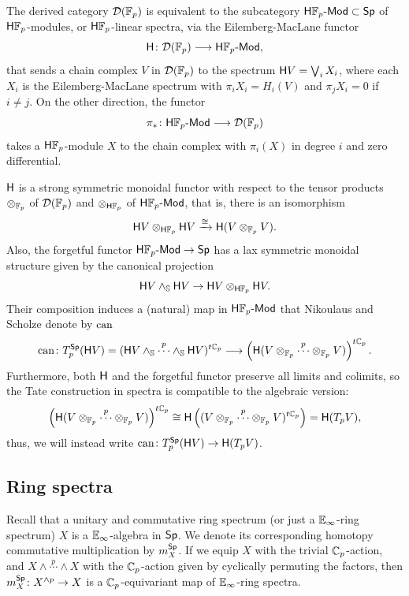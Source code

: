 The derived category \(\mathcal{D}({\mathbb{F}_p})\) is equivalent to the subcategory \(\mathsf{H}{\mathbb{F}_p}\text{-}\mathsf{Mod} \subset \mathsf{Sp}\) of \(\mathsf{H}{\mathbb{F}_p}\)-modules, or \(\mathsf{H}{\mathbb{F}_p}\)-linear spectra, via the Eilemberg-MacLane functor
\[
\mathsf{H} \colon \mathcal{D}({\mathbb{F}_p}) \longrightarrow \mathsf{H}{\mathbb{F}_p}\text{-}\mathsf{Mod},
\]
that sends a chain complex \(V\) in \(\mathcal{D}({\mathbb{F}_p})\) to the spectrum \(\mathsf{H} V = \bigvee_i X_i\), where each \(X_i\) is the Eilemberg-MacLane spectrum with \(\pi_i X_i = H_i(V)\) and \(\pi_jX_i = 0\) if \(i \neq j\).
On the other direction, the functor
\[
\pi_* \colon \mathsf{H}{\mathbb{F}_p}\text{-}\mathsf{Mod} \longrightarrow \mathcal{D}({\mathbb{F}_p})
\]
takes a \(\mathsf{H}{\mathbb{F}_p}\)-module \(X\) to the chain complex with \(\pi_i(X)\) in degree \(i\) and zero differential.

\(\mathsf{H}\) is a strong symmetric monoidal functor with respect to the tensor products \(\otimes_{\mathbb{F}_p}\) of \(\mathcal{D}({\mathbb{F}_p})\) and \(\otimes_{\mathsf{H}{\mathbb{F}_p}}\) of \(\mathsf{H}{\mathbb{F}_p}\text{-}\mathsf{Mod}\), that is, there is an isomorphism
\[
\mathsf{H} V \otimes_{\mathsf{H}{\mathbb{F}_p}} \mathsf{H} V \xrightarrow{\cong} \mathsf{H}(V \otimes_{\mathbb{F}_p} V).
\]
Also, the forgetful functor \(\mathsf{H}{\mathbb{F}_p}\text{-}\mathsf{Mod} \to \mathsf{Sp}\) has a lax symmetric monoidal structure given by the canonical projection
\[
\mathsf{H} V \wedge_{\mathbb{S}} \mathsf{H} V \to \mathsf{H} V \otimes_{\mathsf{H}{\mathbb{F}_p}} \mathsf{H} V.
\]
Their composition induces a (natural) map in \(\mathsf{H}{\mathbb{F}_p}\text{-}\mathsf{Mod}\) that Nikoulaus and Scholze denote by \(\operatorname{can}\)
\[
\operatorname{can} \colon T_p^{\mathsf{Sp}}(\mathsf{H} V) = (\mathsf{H} V \wedge_{\mathbb{S}} \overset{p}{\cdots} \wedge_{\mathbb{S}} \mathsf{H} V)^{t\mathbb{C}_p} \longrightarrow \left(\mathsf{H}(V \otimes_{\mathbb{F}_p} \overset{p}{\cdots} \otimes_{\mathbb{F}_p} V)\right)^{t\mathbb{C}_p}.
\]
Furthermore, both \(\mathsf{H}\) and the forgetful functor preserve all limits and colimits, so the Tate construction in spectra is compatible to the algebraic version:
\[
\left(\mathsf{H}(V \otimes_{\mathbb{F}_p} \overset{p}{\cdots} \otimes_{\mathbb{F}_p} V)\right)^{t\mathbb{C}_p} \cong \mathsf{H}\left((V \otimes_{\mathbb{F}_p} \overset{p}{\cdots} \otimes_{\mathbb{F}_p} V)^{t\mathbb{C}_p}\right) = \mathsf{H}(T_pV),
\]
thus, we will instead write \(\operatorname{can} \colon T_p^{\mathsf{Sp}}(\mathsf{H} V) \to \mathsf{H}(T_pV)\).

\subsection{Ring spectra}

Recall that a unitary and commutative ring spectrum (or just a \(\mathbb{E}_\infty\)-ring spectrum) \(X\) is a \(\mathbb{E}_\infty\)-algebra in \(\mathsf{Sp}\).
We denote its corresponding homotopy commutative multiplication by \(m_X^{\mathsf{Sp}}\).
If we equip \(X\) with the trivial \(\mathbb{C}_p\)-action, and \(X \wedge \overset{p}{\cdots} \wedge X\) with the \(\mathbb{C}_p\)-action given by cyclically permuting the factors, then \(m_X^{\mathsf{Sp}} \colon X^{\wedge p} \to X\) is a \(\mathbb{C}_p\)-equivariant map of \(\mathbb{E}_\infty\)-ring spectra.

